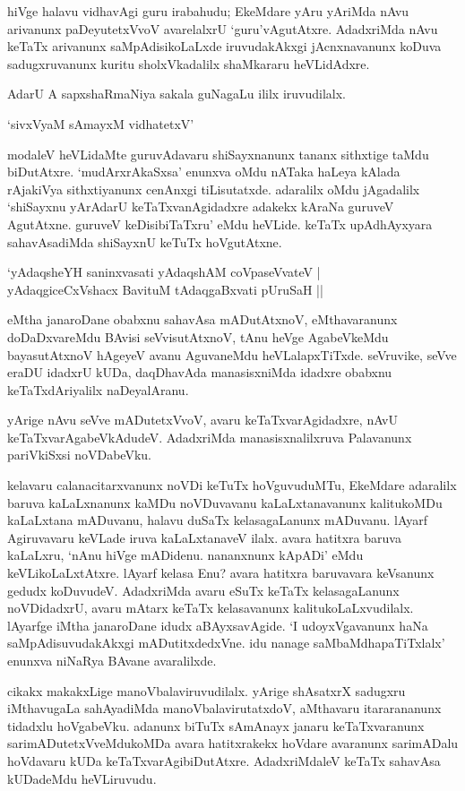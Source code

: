 hiVge halavu vidhavAgi guru irabahudu; EkeMdare yAru yAriMda nAvu arivanunx paDeyutetxVvoV avarelalxrU `guru'vAgutAtxre. AdadxriMda nAvu keTaTx arivanunx saMpAdisikoLaLxde iruvudakAkxgi jAcnxnavanunx koDuva sadugxruvanunx kuritu sholxVkadalilx shaMkararu heVLidAdxre.

AdarU A sapxshaRmaNiya sakala guNagaLu ililx iruvudilalx. 


\begin{shloka}
`sivxVyaM sAmayxM vidhatetxV'
\end{shloka}

modaleV heVLidaMte guruvAdavaru shiSayxnanunx tananx sithxtige taMdu biDutAtxre. `mudArxrAkaSxsa' enunxva oMdu nATaka haLeya kAlada rAjakiVya sithxtiyanunx cenAnxgi tiLisutatxde. adaralilx oMdu jAgadalilx `shiSayxnu yArAdarU keTaTxvanAgidadxre adakekx kAraNa guruveV AgutAtxne. guruveV keDisibiTaTxru' eMdu heVLide. keTaTx upAdhAyxyara sahavAsadiMda shiSayxnU keTuTx hoVgutAtxne.

\begin{shloka}
`yAdaqsheYH saninxvasati yAdaqshAM coVpaseVvateV |\\
yAdaqgiceCxVshacx BavituM tAdaqgaBxvati pUruSaH ||
\end{shloka}

eMtha janaroDane obabxnu sahavAsa mADutAtxnoV, eMthavaranunx doDaDxvareMdu BAvisi seVvisutAtxnoV, tAnu heVge AgabeVkeMdu bayasutAtxnoV hAgeyeV avanu AguvaneMdu heVLalapxTiTxde. seVruvike, seVve eraDU idadxrU kUDa, daqDhavAda manasisxniMda idadxre obabxnu keTaTxdAriyalilx naDeyalAranu. 

yArige nAvu seVve mADutetxVvoV, avaru keTaTxvarAgidadxre, nAvU keTaTxvarAgabeVkAdudeV. AdadxriMda manasisxnalilxruva Palavanunx pariVkiSxsi noVDabeVku.

kelavaru calanacitarxvanunx noVDi keTuTx hoVguvuduMTu, EkeMdare adaralilx baruva kaLaLxnanunx kaMDu noVDuvavanu kaLaLxtanavanunx kalitukoMDu kaLaLxtana mADuvanu, halavu duSaTx kelasagaLanunx mADuvanu. lAyarf Agiruvavaru keVLade iruva kaLaLxtanaveV ilalx. avara hatitxra baruva kaLaLxru, `nAnu hiVge mADidenu. nananxnunx kApADi' eMdu keVLikoLaLxtAtxre. lAyarf kelasa Enu? avara hatitxra baruvavara keVsanunx gedudx koDuvudeV. AdadxriMda avaru eSuTx keTaTx kelasagaLanunx noVDidadxrU, avaru mAtarx keTaTx kelasavanunx kalitukoLaLxvudilalx. lAyarfge iMtha janaroDane idudx aBAyxsavAgide. `I udoyxVgavanunx haNa saMpAdisuvudakAkxgi mADutitxdedxVne. idu nanage saMbaMdhapaTiTxlalx' enunxva niNaRya BAvane avaralilxde. 

cikakx makakxLige manoVbalaviruvudilalx. yArige shAsatxrX sadugxru iMthavugaLa sahAyadiMda manoVbalavirutatxdoV, aMthavaru itararananunx tidadxlu hoVgabeVku. adanunx biTuTx sAmAnayx janaru keTaTxvaranunx sarimADutetxVveMdukoMDa avara hatitxrakekx hoVdare avaranunx sarimADalu hoVdavaru kUDa keTaTxvarAgibiDutAtxre. AdadxriMdaleV keTaTx sahavAsa kUDadeMdu heVLiruvudu.

